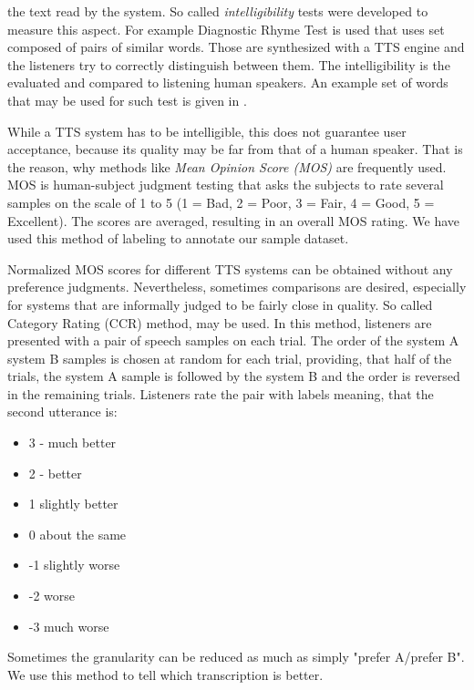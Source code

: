 the text read by the system. So called \textit{intelligibility} tests were developed to measure this aspect.
For example Diagnostic Rhyme Test is used that uses set composed of pairs of similar words.
Those are synthesized with a TTS engine and the listeners try to correctly distinguish between them.
The intelligibility is the evaluated and compared to listening human speakers.
An example set of words that may be used for such test is given in .
\par
While a TTS system has to be intelligible, this does not guarantee user acceptance, because
its quality may be far from that of a human speaker.
That is the reason, why methods like \textit{Mean Opinion Score (MOS)} are frequently used.
MOS is human-subject judgment testing that asks the subjects to rate several samples on the scale of 1 to 5 (1 = Bad, 2 = Poor, 3 = Fair, 4 = Good, 5 = Excellent).
The scores are averaged, resulting in an overall MOS rating.
We have used this method of labeling to annotate our sample dataset.
\par
Normalized MOS scores for different TTS systems can be obtained without any preference judgments.
Nevertheless, sometimes comparisons are desired, especially for systems that are informally judged to be fairly close in quality.
So called Category Rating (CCR) method, may be used.
In this method, listeners are presented with a pair of speech samples on each trial. The order of the system A system B samples is chosen at random for each trial, providing, that half of the trials, the system A sample is followed by the system B and the order is reversed in the remaining trials.
Listeners rate the pair with labels meaning, that the second utterance is:
\begin{itemize}
\item 3 - much better
\item 2 - better
\item 1 slightly better
\item 0 about the same
\item -1 slightly worse
\item -2 worse
\item -3 much worse
\end{itemize}
Sometimes the granularity can be reduced as much as simply "prefer A/prefer B".
We use this method to tell which transcription is better.
